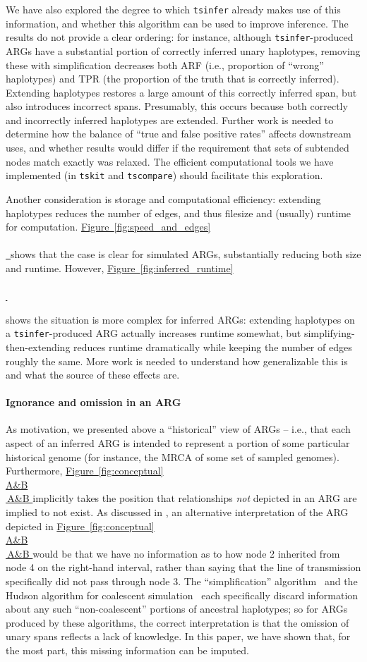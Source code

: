 \documentclass[10pt,twoside,lineno]{gsajnl}
\newcommand{\tskit}{\texttt{tskit}}
\newcommand{\tscompare}{\texttt{tscompare}}
\newcommand{\tsinfer}{\texttt{tsinfer}}
\newcommand*{\figref}[2][]{%
	\hyperref[{#2}]{%
		Figure~\ref*{#2}%
		\ifx\\#1\\%
		\else
		\,#1%
		\fi
	}%
}
\begin{document}
We have also explored the degree to which \tsinfer{} already makes use of this information,
and whether this algorithm can be used to improve inference.
The results do not provide a clear ordering:
for instance, although \tsinfer-produced ARGs
have a substantial portion of correctly inferred unary haplotypes,
removing these with simplification decreases both ARF
(i.e., proportion of ``wrong'' haplotypes)
and TPR (the proportion of the truth that is correctly inferred).
Extending haplotypes restores a large amount of this correctly inferred span,
but also introduces incorrect spans.
Presumably, this occurs because both correctly and incorrectly inferred haplotypes are extended. 
Further work is needed to determine how the balance of ``true and false positive rates''
affects downstream uses,
and whether results would differ if the requirement that sets of subtended nodes match exactly
was relaxed.
The efficient computational tools we have implemented (in \tskit{} and \tscompare{})
should facilitate this exploration.

Another consideration is storage and computational efficiency: 
extending haplotypes reduces the number of edges,
and thus filesize and (usually) runtime for computation.
\figref{fig:speed_and_edges} shows that the case is clear for simulated ARGs,
substantially reducing both size and runtime.
However, \figref{fig:inferred_runtime}
shows the situation is more complex for inferred ARGs:
extending haplotypes on a \tsinfer-produced ARG actually increases runtime somewhat,
but simplifying-then-extending reduces runtime dramatically
while keeping the number of edges roughly the same.
More work is needed to understand how generalizable this is and what the source of these effects are.

\paragraph{Ignorance and omission in an ARG} 
As motivation, we presented above a ``historical'' view of ARGs --
i.e., that each aspect of an inferred ARG is intended to represent
a portion of some particular historical genome
(for instance, the MRCA of some set of sampled genomes).
Furthermore, \figref[A\&B]{fig:conceptual} implicitly takes the position
that relationships \emph{not} depicted in an ARG are implied to not exist.
As discussed in \citet{wong2024general},
an alternative interpretation
of the ARG depicted in \figref[A\&B]{fig:conceptual} would be that we have no information as to 
how node 2 inherited from node 4 on the right-hand interval,
rather than saying that the line of transmission specifically did not pass
through node 3.
The ``simplification'' algorithm~\citep{kelleher2018efficient}
and the Hudson algorithm for coalescent
simulation~\citep{hudson1983properties,kelleher2016efficient}
each specifically discard information about any such ``non-coalescent'' portions of ancestral haplotypes;
so for ARGs produced by these algorithms, the correct interpretation is that
the omission of unary spans reflects a lack of knowledge.
In this paper, we have shown that, for the most part, this missing information can be imputed.
\end{document}
